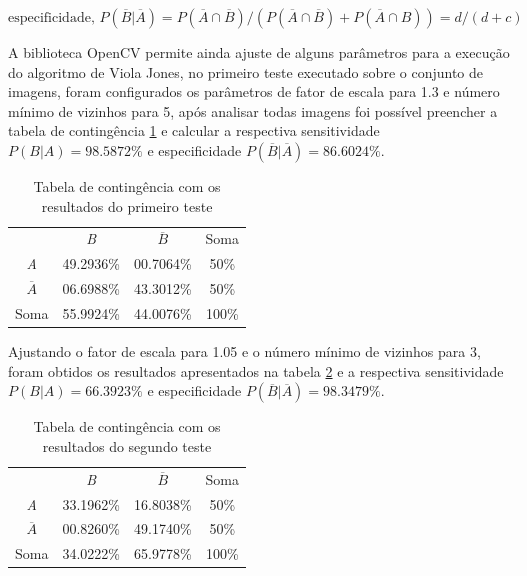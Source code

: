 \begin{equation} \label{eq:especificidade}
    \text{especificidade, } P(\overline{B} | \overline{A}) = P(\overline{A} \cap \overline{B}) / (P(\overline{A} \cap \overline{B}) + P(\overline{A} \cap B)) = d/(d + c)
\end{equation}

A biblioteca OpenCV permite ainda ajuste de alguns parâmetros para a execução do algoritmo de Viola Jones, no primeiro teste executado sobre o conjunto de imagens, foram configurados os parâmetros de fator de escala para 1.3 e número mínimo de vizinhos para 5, após analisar todas imagens foi possível preencher a tabela de contingência \ref{tab:tabela_contingencia_teste1} e calcular a respectiva sensitividade $P(B|A) = 98.5872\%$ e especificidade $P(\overline{B} | \overline{A}) = 86.6024\%$.

\begin{table}[htbp]
    \caption{Tabela de contingência com os resultados do primeiro teste}
    \label{tab:tabela_contingencia_teste1}
    \centering
    \begin{tabular}{cccc}\hline\hline
        & \textit{B} & $\overline{B}$ & Soma\\
    \textit{A} & 49.2936\% & 00.7064\% & 50\% \\
    $\overline{A}$ & 06.6988\% & 43.3012\% & 50\% \\
    Soma & 55.9924\% & 44.0076\% & 100\% \\
    \hline\hline
    \end{tabular}
\end{table}

Ajustando o fator de escala para 1.05 e o número mínimo de vizinhos para 3, foram obtidos os resultados apresentados na tabela \ref{tab:tabela_contingencia_teste2} e a respectiva sensitividade $P(B|A) = 66.3923\%$ e especificidade $P(\overline{B} | \overline{A}) = 98.3479\%$.

\begin{table}[htbp]
    \caption{Tabela de contingência com os resultados do segundo teste}
    \label{tab:tabela_contingencia_teste2}
    \centering
    \begin{tabular}{cccc}\hline\hline
        & \textit{B} & $\overline{B}$ & Soma\\
    \textit{A}& 33.1962\% & 16.8038\% & 50\% \\
    $\overline{A}$& 00.8260\% & 49.1740\% & 50\% \\
    Soma& 34.0222\% & 65.9778\% & 100\% \\
    \hline\hline
    \end{tabular}
\end{table}

